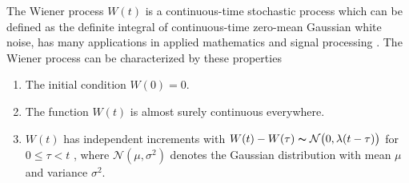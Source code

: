 \documentclass{article}
\newcommand{\N}{\mathcal{N}}
\begin{document}
The Wiener process $W(t)$ is a continuous-time stochastic process
which can be defined as the definite integral of continuous-time
zero-mean Gaussian white noise, has many applications in applied mathematics
and signal processing \cite{arnold}. The Wiener process can be
characterized by these properties~\cite{durrett2010}
\begin{enumerate}
\item The initial condition $W(0)=0$.\vspace{-2mm}
\item The function $W(t)$ is almost surely continuous everywhere.\vspace{-2mm}
\item $W(t)$ has independent increments with $ W(t)-W(\tau)\thicksim \N\big(0, \lambda(t - \tau)\big)$  for $0 \leq \tau < t$ , where $\N(\mu, \sigma^2)$ denotes the Gaussian distribution with mean $\mu$ and variance $\sigma^2$.\vspace{-2mm}
\end{enumerate}
\end{document}
